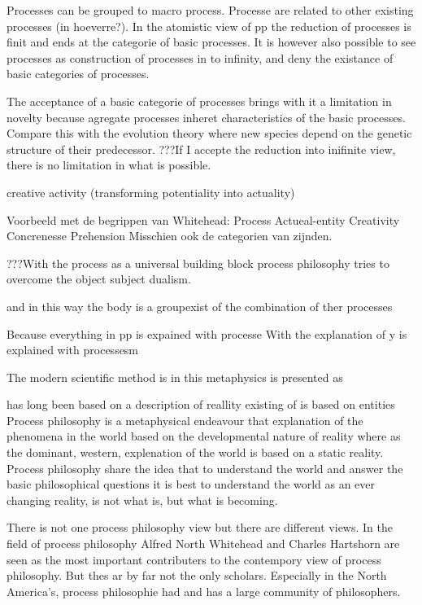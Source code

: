 Processes can be grouped to macro process. Processe are related to other existing processes (in hoeverre?).
In the atomistic view of pp the reduction of processes is finit and ends at the categorie of basic processes. It is however also possible to see processes as construction of processes in to infinity, and deny the existance of basic categories of processes.

The acceptance of a basic categorie of processes brings with it a limitation in novelty because agregate processes inheret characteristics of the basic processes. Compare this with the evolution theory where new species depend on the genetic structure of their predecessor.
???If I accepte the reduction into inifinite view, there is no limitation in what is possible.

creative activity (transforming potentiality into actuality)

Voorbeeld met de begrippen van Whitehead:
Process
Actueal-entity
Creativity
Concrenesse
Prehension
Misschien ook de categorien van zijnden.


???With the process as a universal building block process philosophy tries to overcome the object subject dualism.

 and in this way the body is a groupexist of the combination of ther processes

Because everything in pp is expained with processe
With the explanation of y is explained with processesm




The modern scientific method is 
in this metaphysics is presented as 


has long been based on a description of reallity existing of 
is based on entities
Process philosophy is a metaphysical endeavour that  explanation of the phenomena in the world based on the developmental nature of reality where as the dominant, western, explenation of the world is based on a static reality. 
Process philosophy share the idea that to understand the world and answer the basic philosophical questions it is best to understand the world as an ever changing reality, is not what is, but what is becoming.

There is not one process philosophy view but there are different views.
In the field of process philosophy Alfred North Whitehead and Charles Hartshorn are seen as the most important contributers to the contempory view of process philosophy. 
But thes ar by far not the only scholars. Especially in the North America's, process philosophie had and has a large community of philosophers. 

